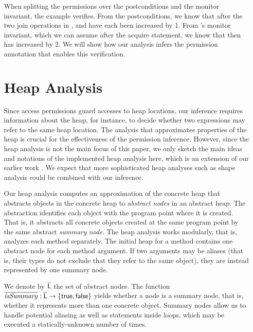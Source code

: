 \documentclass{llncs}
\begin{document}
When splitting the permissions over the postconditions and the monitor
invariant, the example verifies. From the postconditions, we know that
after the two join operations in ,  and
 have each been increased by 1. From 's
monitor invariant, which we can assume after the acquire statement, we
know that then  has increased by 2. We will show how our
analysis infers the permission annotation that enables this
verification.


\goup
\section{Heap Analysis}
\goup
\label{sect:heapanalysis}

Since access permissions guard accesses to heap locations, our
inference requires information about the heap, for instance, to decide
whether two expressions may refer to the same heap location. The
analysis that approximates properties of the heap is crucial for the
effectiveness of the permission inference.  However, since the heap
analysis is not the main focus of this paper, we only sketch the main
ideas and notations of the implemented heap analysis here, which is an
extension of our earlier work \cite{FER08a}. We expect that more
sophisticated heap analyses such as shape analysis \cite{SRW02} could
be combined with our inference.

Our heap analysis computes an approximation of the concrete heap that
abstracts objects in the concrete heap to \emph{abstract nodes} in an
abstract heap. The abstraction identifies each object with the program
point where it is created. That is, it abstracts all concrete objects
created at the same program point by the same abstract \emph{summary
  node}. The heap analysis works modularly, that is, analyzes each
method separately. The initial heap for a method contains one abstract
node for each method argument. If two arguments may be aliases (that is,
their types do not exclude that they refer to the same object), they are
instead represented by one summary node.


We denote by $\mathsf{\overline{L}}$ the set of abstract nodes. The function
$\overline{\mathit{isSummary}}:\mathsf{\overline{L}} \rightarrow\{\mathsf{true},
  \mathsf{false}\} $ yields whether a node is a summary node, that
is, whether it represents more than one concrete object. Summary nodes
allow us to handle potential aliasing as well as 
statements  inside  loops, which may be executed a statically-unknown
number of times. 
\end{document}
